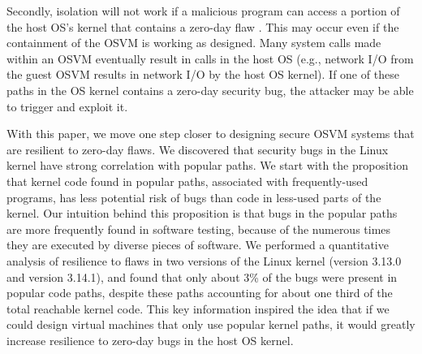 Secondly, isolation will not work if a malicious
program can access a portion of the host OS's kernel that contains a
zero-day flaw \cite{CVE-2016-5195}. This may occur even if the containment of the OSVM is
working as designed. 
Many system calls made within an OSVM eventually
result in calls in the host OS (e.g., network I/O from the guest
OSVM results in network I/O by the host OS kernel). If one of these paths in
the OS kernel contains a zero-day security bug, the attacker
may be able to trigger and exploit it.



With this paper, we move one step closer to designing secure OSVM systems that are
resilient to zero-day flaws. 
We discovered that security bugs in the Linux kernel have strong correlation with popular paths. 
We start with the proposition that kernel code found in popular paths, associated with frequently-used programs,
has less potential risk of bugs than code in less-used parts of the kernel.
Our intuition behind this proposition is that bugs in the popular paths are
more frequently found in software testing, because of the numerous times they are executed by
diverse pieces of software.
We performed a quantitative analysis of resilience
to flaws in two versions of the Linux kernel (version 3.13.0 and version 3.14.1), and
found that only about 3\% of the bugs were present in popular code paths,
despite these paths accounting for about one third of the total reachable
kernel code. 
This key information inspired the idea that 
if we could design virtual machines that only use popular kernel paths, 
it would greatly increase resilience to zero-day bugs in the host OS kernel. 

